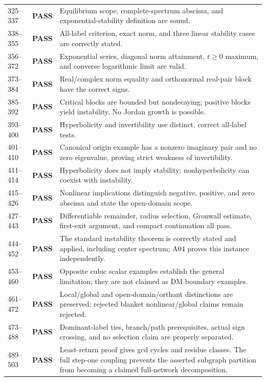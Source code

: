 \documentclass[11pt]{article}
\begin{document}
{\begin{longtable}{L{0.10\textwidth}L{0.17\textwidth}L{0.64\textwidth}}
325--337 & \textbf{PASS} & Equilibrium scope, complete-spectrum abscissa, and exponential-stability definition are sound.\\
338--355 & \textbf{PASS} & All-label criterion, exact norm, and three linear stability cases are correctly stated.\\
356--372 & \textbf{PASS} & Exponential series, diagonal norm attainment, $t\ge0$ maximum, and converse logarithmic limit are valid.\\
373--384 & \textbf{PASS} & Real/complex norm equality and orthonormal real-pair block have the correct signs.\\
385--392 & \textbf{PASS} & Critical blocks are bounded but nondecaying; positive blocks yield instability. No Jordan growth is possible.\\
393--400 & \textbf{PASS} & Hyperbolicity and invertibility use distinct, correct all-label tests.\\
401--410 & \textbf{PASS} & Canonical origin example has a nonzero imaginary pair and no zero eigenvalue, proving strict weakness of invertibility.\\
411--414 & \textbf{PASS} & Hyperbolicity does not imply stability; nonhyperbolicity can coexist with instability.\\
415--426 & \textbf{PASS} & Nonlinear implications distinguish negative, positive, and zero abscissa and state the open-domain scope.\\
427--443 & \textbf{PASS} & Differentiable remainder, radius selection, Gronwall estimate, first-exit argument, and compact continuation all pass.\\
444--452 & \textbf{PASS} & The standard instability theorem is correctly stated and applied, including center spectrum; A04 proves this instance independently.\\
453--460 & \textbf{PASS} & Opposite cubic scalar examples establish the general limitation; they are not claimed as DM boundary examples.\\
461--472 & \textbf{PASS} & Local/global and open-domain/orthant distinctions are preserved; rejected blanket nonlinear/global claims remain rejected.\\
473--488 & \textbf{PASS} & Dominant-label ties, branch/path prerequisites, actual sign crossing, and no selection claim are properly separated.\\
489--503 & \textbf{PASS} & Least-return proof gives gcd cycles and residue classes. The full step-one coupling prevents the asserted subgraph partition from becoming a claimed full-network decomposition.\\

\end{longtable}}
\end{document}

